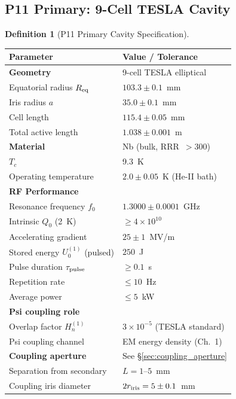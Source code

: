 \documentclass[11pt,twocolumn]{article}
\newcommand{\ee}[1]{\times 10^{#1}}
\newcommand{\Heff}{H_n}
\theoremstyle{definition}
\newtheorem{definition}[theorem]{Definition}
\theoremstyle{remark}
\begin{document}
\subsection{P11 Primary: 9-Cell TESLA Cavity}
\label{sec:p11_primary_spec}

\begin{definition}[P11 Primary Cavity Specification]
\label{def:p11_primary}
\begin{center}
\renewcommand{\arraystretch}{1.2}
\begin{tabular}{@{}p{3.5cm}p{4.5cm}@{}}
\toprule
Parameter & Value / Tolerance \\
\midrule
\textbf{Geometry} & 9-cell TESLA elliptical \\
Equatorial radius $R_{\rm eq}$ & $103.3 \pm 0.1$~mm \\
Iris radius $a$ & $35.0 \pm 0.1$~mm \\
Cell length & $115.4 \pm 0.05$~mm \\
Total active length & $1.038 \pm 0.001$~m \\
\midrule
\textbf{Material} & Nb (bulk, RRR~$>300$) \\
$T_c$ & 9.3~K \\
Operating temperature & $2.0 \pm 0.05$~K (He-II bath) \\
\midrule
\textbf{RF Performance} & \\
Resonance frequency $f_0$ & $1.3000 \pm 0.0001$~GHz \\
Intrinsic $Q_0$ (2~K) & $\geq 4\ee{10}$ \\
Accelerating gradient & $25 \pm 1$~MV/m \\
Stored energy $U_0^{(1)}$ (pulsed) & $250$~J \\
Pulse duration $\tau_{\rm pulse}$ & $\geq 0.1$~s \\
Repetition rate & $\leq 10$~Hz \\
Average power & $\leq 5$~kW \\
\midrule
\textbf{Psi coupling role} & \\
Overlap factor $\Heff^{(1)}$ & $3\ee{-5}$ (TESLA standard) \\
Psi coupling channel & EM energy density (Ch.~1) \\
\midrule
\textbf{Coupling aperture} & See \S\ref{sec:coupling_aperture} \\
Separation from secondary & $L = 1$--$5$~mm \\
Coupling iris diameter & $2r_{\rm iris} = 5 \pm 0.1$~mm \\
\bottomrule
\end{tabular}
\end{center}
\end{definition}
\end{document}
